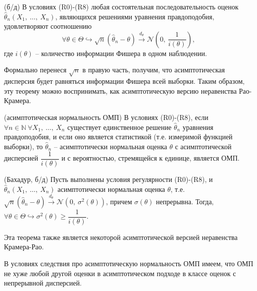 \begin{theorem} (б/д)
    В условиях (R0)-(R8) любая состоятельная последовательность оценок $\displaystyle \hat{\theta }_{n}( X_{1} ,\ \dotsc ,\ X_{n})$, являющихся решениями уравнения правдоподобия, удовлетворяют соотношению
    \begin{equation*}
        \forall \theta \in \Theta \hookrightarrow \sqrt{n}(\hat{\theta }_{n} -\theta )\xrightarrow{d_{\theta }}\mathcal{N}\left( 0,\, \dfrac{1}{i( \theta )}\right) ,
    \end{equation*}
    где $\displaystyle i( \theta )$ -- количество информации Фишера в одном наблюдении.
\end{theorem}

\begin{note}
    Формально перенеся $\displaystyle \sqrt{n}$ в правую часть, получим, что асимптотическая дисперсия будет равняться информации Фишера всей выборки. Таким образом, эту теорему можно воспринимать, как асимптотическую версию неравенства Рао-Крамера.
\end{note}
\begin{corollary}
    (асимптотическая нормальность ОМП) В условиях (R0)-(R8), если $\displaystyle \forall n\in \mathbb{N} \ \forall X_{1} ,\ \dotsc ,\ X_{n}$ существует единственное решение $\displaystyle \hat{\theta }_{n}$ уравнения правдоподобия, и если оно является статистикой (т.е. измеримой функцией выборки), то $\displaystyle \hat{\theta }_{n}$ -- асимптотически нормальная оценка $\displaystyle \theta $ с асимптотической дисперсией $\displaystyle \dfrac{1}{i( \theta )}$ и с вероятностью, стремящейся к единице, является ОМП. 
\end{corollary}
\begin{theorem}
    (Бахадур, б/д) Пусть выполнены условия регулярности (R0)-(R8), и $\displaystyle \hat{\theta }_{n}( X_{1} ,\ \dotsc ,\ X_{n})$ асимптотически нормальная оценка $\displaystyle \theta $, т.е. $\displaystyle \sqrt{n}(\hat{\theta }_{n} -\theta )\xrightarrow{d_{\theta }}\mathcal{N}\left( 0,\ \sigma ^{2}( \theta )\right)$, причем $\displaystyle \sigma ( \theta )$ непрерывна. Тогда, $\displaystyle \forall \theta \in \Theta \hookrightarrow \sigma ^{2}( \theta ) \geqslant \dfrac{1}{i( \theta )}$.
\end{theorem}
\begin{note}
    Эта теорема также является некоторой асимптотической версией неравенства Крамера-Рао.
\end{note}
\begin{corollary}
    В условиях следствия про асимптотическую нормальность ОМП имеем, что ОМП не хуже любой другой оценки в асимптотическом подходе в классе оценок с непрерывной дисперсией.
\end{corollary}
